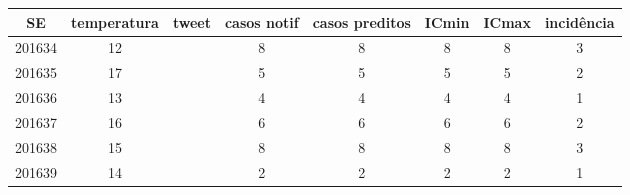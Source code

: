 \begin{tabular}{c|ccccccc}
  \hline
SE & temperatura & tweet & casos notif & casos preditos & ICmin & ICmax & incidência \\ 
  \hline
201634 & 12 &  & 8 & 8 & 8 & 8 & 3 \\ 
  201635 & 17 &  & 5 & 5 & 5 & 5 & 2 \\ 
  201636 & 13 &  & 4 & 4 & 4 & 4 & 1 \\ 
  201637 & 16 &  & 6 & 6 & 6 & 6 & 2 \\ 
  201638 & 15 &  & 8 & 8 & 8 & 8 & 3 \\ 
  201639 & 14 &  & 2 & 2 & 2 & 2 & 1 \\ 
   \hline
\end{tabular}
